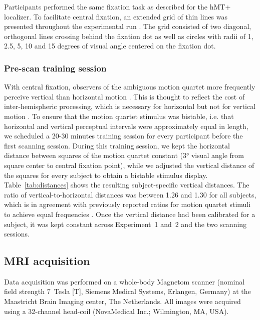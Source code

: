 Participants performed the same fixation task as described for the hMT+ localizer. To facilitate central fixation, an extended grid of thin lines was presented throughout the experimental run \parencite{Tyler2005}. The grid consisted of two diagonal, orthogonal lines crossing behind the fixation dot as well as circles with radii of 1, 2.5, 5, 10 and 15 degrees of visual angle centered on the fixation dot.

\subsubsection{Pre-scan training session}
\label{sec:trainses}
With central fixation, observers of the ambiguous motion quartet more frequently perceive vertical than horizontal motion \parencite{Glaser1991}. This is thought to reflect the cost of inter-hemispheric processing, which is necessary for horizontal but not for vertical motion \parencite{Glaser1991, Gen2011}. To ensure that the motion quartet stimulus was bistable, i.e. that horizontal and vertical perceptual intervals were approximately equal in length, we scheduled a 20-30 minutes training session for every participant before the first scanning session. During this training session, we kept the horizontal distance between squares of the motion quartet constant (3° visual angle from square center to central fixation point), while we adjusted the vertical distance of the squares for every subject to obtain a bistable stimulus display. Table~\ref{tab:distances} shows the resulting subject-specific vertical distances. The ratio of vertical-to-horizontal distances was between 1.26 and 1.30 for all subjects, which is in agreement with previously reported ratios for motion quartet stimuli to achieve equal frequencies \parencite{Glaser1991}. Once the vertical distance had been calibrated for a subject, it was kept constant across Experiment~1 and~2 and the two scanning sessions.

\subsection{MRI acquisition}
Data acquisition was performed on a whole-body Magnetom scanner (nominal field strength 7~Tesla [T], Siemens Medical Systems, Erlangen, Germany) at the Maastricht Brain Imaging center, The Netherlands. All images were acquired using a 32-channel head-coil (NovaMedical Inc.; Wilmington, MA, USA).

